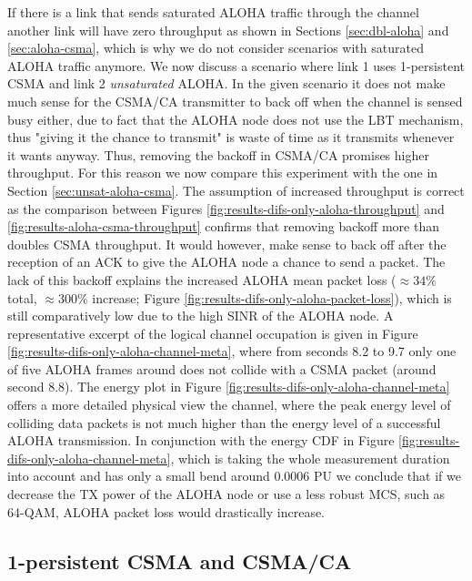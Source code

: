 If there is a link that sends saturated ALOHA traffic through the channel another link will have zero throughput as shown in Sections \ref{sec:dbl-aloha} and \ref{sec:aloha-csma}, which is why we do not consider scenarios with saturated ALOHA traffic anymore. We now discuss a scenario where link 1 uses 1-persistent CSMA and link 2 \emph{unsaturated} ALOHA. In the given scenario it does not make much sense for the CSMA/CA transmitter to back off when the channel is sensed busy either, due to fact that the ALOHA node does not use the LBT mechanism, thus "giving it the chance to transmit" is waste of time as it transmits whenever it wants anyway. Thus, removing the backoff in CSMA/CA promises higher throughput. For this reason we now compare this experiment with the one in Section \ref{sec:unsat-aloha-csma}. The assumption of increased throughput is correct as the comparison between Figures \ref{fig:results-difs-only-aloha-throughput} and \ref{fig:results-aloha-csma-throughput} confirms that removing backoff more than doubles CSMA throughput. It would however, make sense to back off after the reception of an ACK to give the ALOHA node a chance to send a packet. The lack of this backoff explains the increased ALOHA mean packet loss ($\approx 34\%$ total, $\approx 300\%$ increase;  Figure \ref{fig:results-difs-only-aloha-packet-loss}), which is still comparatively low due to the high SINR of the ALOHA node. A representative excerpt of the logical channel occupation is given in Figure \ref{fig:results-difs-only-aloha-channel-meta}, where from seconds 8.2 to 9.7 only one of five ALOHA frames around does not collide with a CSMA packet (around second 8.8). The energy plot in Figure  \ref{fig:results-difs-only-aloha-channel-meta} offers a more detailed physical view the channel, where the peak energy level of colliding data packets is not much higher than the energy level of a successful ALOHA transmission. In conjunction with the energy CDF in Figure \ref{fig:results-difs-only-aloha-channel-meta}, which is taking the whole measurement duration into account and has only a small bend around 0.0006 PU we conclude that if we decrease the TX power of the ALOHA node or use a less robust MCS, such as 64-QAM, ALOHA packet loss would drastically increase. 

\clearpage

\subsection{1-persistent CSMA and CSMA/CA}

